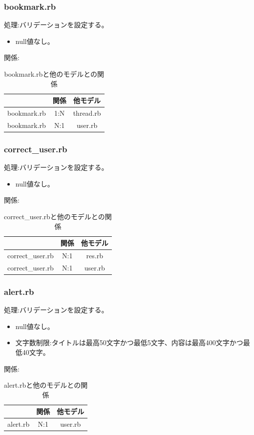 \documentclass[a4j]{jarticle}
\begin{document}
\subsubsection{bookmark.rb}
\noindent
処理:バリデーションを設定する。
\begin{itemize}
  \item null値なし。
\end{itemize}
関係:
\begin{table}[H]
  \centering
  \caption{bookmark.rbと他のモデルとの関係}
  \begin{tabular}{|c|c|c|}\hline
    & 関係 & 他モデル\\ \hline \hline
    bookmark.rb & 1:N & thread.rb \\ \hline
    bookmark.rb & N:1 & user.rb \\ \hline
  \end{tabular}
\end{table}

\subsubsection{correct\_user.rb}
\noindent
処理:バリデーションを設定する。
\begin{itemize}
  \item null値なし。
\end{itemize}
関係:
\begin{table}[H]
  \centering
  \caption{correct\_user.rbと他のモデルとの関係}
  \begin{tabular}{|c|c|c|}\hline
    & 関係 & 他モデル\\ \hline \hline
    correct\_user.rb & N:1 & res.rb \\ \hline
    correct\_user.rb & N:1 & user.rb \\ \hline
  \end{tabular}
\end{table}


\subsubsection{alert.rb}
\noindent
処理:バリデーションを設定する。
\begin{itemize}
  \item null値なし。
  \item 文字数制限:タイトルは最高50文字かつ最低5文字、内容は最高400文字かつ最低40文字。
\end{itemize}
関係:
\begin{table}[H]
  \centering
  \caption{alert.rbと他のモデルとの関係}
  \begin{tabular}{|c|c|c|}\hline
    & 関係 & 他モデル\\ \hline \hline
    alert.rb & N:1 & user.rb \\ \hline
  \end{tabular}
\end{table}
\end{document}
